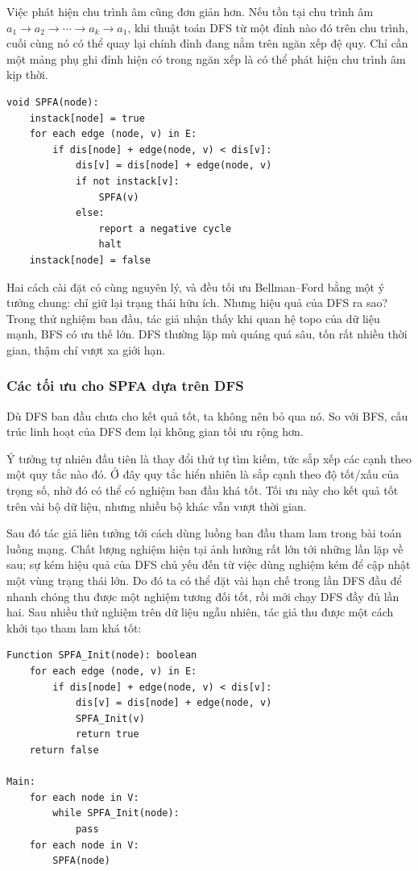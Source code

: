 \documentclass[11pt]{article}
\begin{document}
Việc phát hiện chu trình âm cũng đơn giản hơn. Nếu tồn tại chu trình âm
\(a_1\to a_2\to\cdots\to a_k\to a_1\), khi thuật toán DFS từ một đỉnh nào đó
trên chu trình, cuối cùng nó có thể quay lại chính đỉnh đang nằm trên ngăn xếp
đệ quy. Chỉ cần một mảng phụ ghi đỉnh hiện có trong ngăn xếp là có thể phát
hiện chu trình âm kịp thời.

\begin{verbatim}
void SPFA(node):
    instack[node] = true
    for each edge (node, v) in E:
        if dis[node] + edge(node, v) < dis[v]:
            dis[v] = dis[node] + edge(node, v)
            if not instack[v]:
                SPFA(v)
            else:
                report a negative cycle
                halt
    instack[node] = false
\end{verbatim}

Hai cách cài đặt có cùng nguyên lý, và đều tối ưu Bellman--Ford bằng một ý
tưởng chung: chỉ giữ lại trạng thái hữu ích. Nhưng hiệu quả của DFS ra sao?
Trong thử nghiệm ban đầu, tác giả nhận thấy khi quan hệ topo của dữ liệu
mạnh, BFS có ưu thế lớn. DFS thường lặp mù quáng quá sâu, tốn rất nhiều thời
gian, thậm chí vượt xa giới hạn.

\subsubsection{Các tối ưu cho SPFA dựa trên DFS}

Dù DFS ban đầu chưa cho kết quả tốt, ta không nên bỏ qua nó. So với BFS, cấu
trúc linh hoạt của DFS đem lại không gian tối ưu rộng hơn.

Ý tưởng tự nhiên đầu tiên là thay đổi thứ tự tìm kiếm, tức sắp xếp các cạnh
theo một quy tắc nào đó. Ở đây quy tắc hiển nhiên là sắp cạnh theo độ tốt/xấu
của trọng số, nhờ đó có thể có nghiệm ban đầu khá tốt. Tối ưu này cho kết quả
tốt trên vài bộ dữ liệu, nhưng nhiều bộ khác vẫn vượt thời gian.

Sau đó tác giả liên tưởng tới cách dùng luồng ban đầu tham lam trong bài toán
luồng mạng. Chất lượng nghiệm hiện tại ảnh hưởng rất lớn tới những lần lặp về
sau; sự kém hiệu quả của DFS chủ yếu đến từ việc dùng nghiệm kém để cập nhật
một vùng trạng thái lớn. Do đó ta có thể đặt vài hạn chế trong lần DFS đầu để
nhanh chóng thu được một nghiệm tương đối tốt, rồi mới chạy DFS đầy đủ lần
hai. Sau nhiều thử nghiệm trên dữ liệu ngẫu nhiên, tác giả thu được một cách
khởi tạo tham lam khá tốt:

\begin{verbatim}
Function SPFA_Init(node): boolean
    for each edge (node, v) in E:
        if dis[node] + edge(node, v) < dis[v]:
            dis[v] = dis[node] + edge(node, v)
            SPFA_Init(v)
            return true
    return false

Main:
    for each node in V:
        while SPFA_Init(node):
            pass
    for each node in V:
        SPFA(node)
\end{verbatim}
\end{document}
